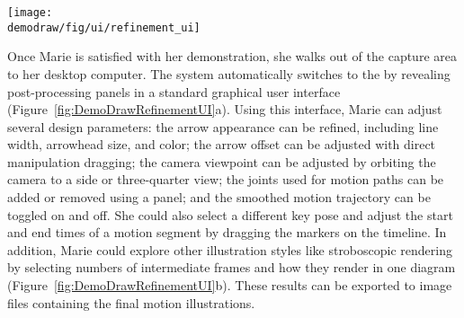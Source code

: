 \begin{figure*}[t!]
  \centering
  \texttt{[image: \\demodraw/fig/ui/refinement\_ui]}
  \caption{Using \systemname{}'s \phaseII{}, the author can refine the visuals (a) and explore more illustration effects (b, c).}
  \label{fig:DemoDrawRefinementUI}
\end{figure*}

Once Marie is satisfied with her demonstration, she walks out of the capture area to her desktop computer. The system automatically switches to the \phaseII{} by revealing post-processing panels in a standard graphical user interface (Figure~\ref{fig:DemoDrawRefinementUI}a).
Using this interface, Marie can adjust several design parameters:
the arrow appearance can be refined, including line width, arrowhead size, and color;
the arrow offset can be adjusted with direct manipulation dragging; %
the camera viewpoint can be adjusted by orbiting the camera to a side or three-quarter view;
the joints used for motion paths can be added or removed using a panel;
and the smoothed motion trajectory can be toggled on and off.
%
She could also select a different key pose and adjust the start and end times of a motion segment by dragging the markers on the timeline.
%
In addition, Marie could explore other illustration styles like stroboscopic rendering by selecting numbers of intermediate frames and how they render in one diagram (Figure~\ref{fig:DemoDrawRefinementUI}b).
%
These results can be exported to image files containing the final motion illustrations. %



